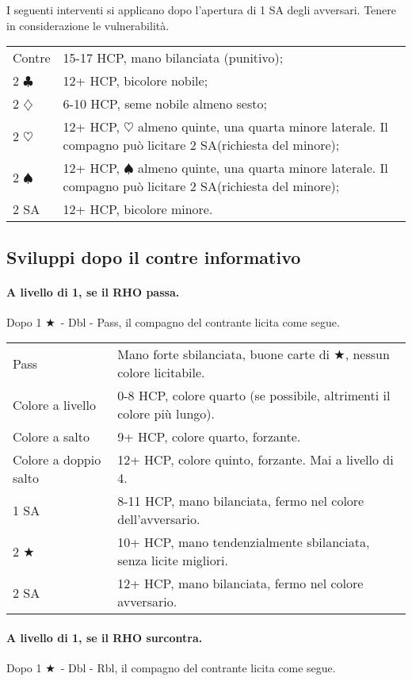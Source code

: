 \documentclass[a4paper,10pt]{article}
\renewcommand{\c}{$\clubsuit$\xspace}
\renewcommand{\d}{$\diamondsuit$\xspace}
\newcommand{\h}{$\heartsuit$\xspace}
\newcommand{\s}{$\spadesuit$\xspace}
\renewcommand{\j}{$\bigstar$\xspace}
\newcommand{\sa}{SA\xspace}
\newcommand{\smallspace}{\vskip0.3cm}
\newenvironment{twocol}
  {\smallspace\noindent\begin{tabular}{l p{0.78\textwidth}}}
  {\end{tabular}\smallspace}
\begin{document}
I seguenti interventi si applicano dopo l'apertura di 1 \sa degli avversari. Tenere in considerazione le vulnerabilità.
\begin{twocol}
 Contre & 15-17 HCP, mano bilanciata (punitivo);\\
 2 \c & 12+ HCP, bicolore nobile;\\
 2 \d & 6-10 HCP, seme nobile almeno sesto;\\
 2 \h & 12+ HCP, \h almeno quinte, una quarta minore laterale. Il compagno può licitare 2 \sa (richiesta del minore);\\
 2 \s & 12+ HCP, \s almeno quinte, una quarta minore laterale. Il compagno può licitare 2 \sa (richiesta del minore);\\
 2 \sa & 12+ HCP, bicolore minore.\\
\end{twocol}




\subsection{Sviluppi dopo il contre informativo}

\paragraph{A livello di 1, se il RHO passa.} Dopo 1 \j\ - Dbl - Pass, il compagno del contrante licita come segue.

\begin{twocol}
	Pass & Mano forte sbilanciata, buone carte di \j, nessun colore licitabile. \\
	Colore a livello & 0-8 HCP, colore quarto (se possibile, altrimenti il colore più lungo). \\
	Colore a salto & 9+ HCP, colore quarto, forzante. \\
	Colore a doppio salto & 12+ HCP, colore quinto, forzante. Mai a livello di 4. \\
	1 \sa & 8-11 HCP, mano bilanciata, fermo nel colore dell'avversario. \\
	2 \j & 10+ HCP, mano tendenzialmente sbilanciata, senza licite migliori. \\
	2 \sa & 12+ HCP, mano bilanciata, fermo nel colore avversario. \\
\end{twocol}

\paragraph{A livello di 1, se il RHO surcontra.} Dopo 1 \j\ - Dbl - Rbl, il compagno del contrante licita come segue.
\end{document}
